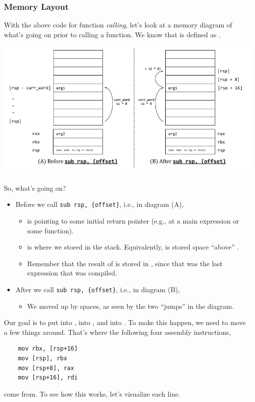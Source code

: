 \subsubsection{Memory Layout}
With the above code for function \emph{calling}, let's look at a memory diagram of what's going on prior to calling a function. We know that  is defined as .
\begin{center}
    \includegraphics[scale=0.5]{assets/function_stack_mem.png}
\end{center}

So, what's going on? 
\begin{itemize}
    \item Before we call \verb|sub rsp, {offset}|, i.e., in diagram (A), 
    \begin{itemize}
        \item \code{[rsp]} is pointing to some initial return pointer (e.g., at a main expression or some function).
        \item {} is where we stored  in the stack. Equivalently,  is stored  space ``above'' .
        \item Remember that the result of  is stored in , since that was the last expression that was compiled.
    \end{itemize}

    \item After we call \verb|sub rsp, {offset}|, i.e., in diagram (B), 
    \begin{itemize}
        \item We moved \code{[rsp]} up by  spaces, as seen by the two ``jumps'' in the diagram. 
    \end{itemize}
\end{itemize}
Our goal is to put  into \code{[rsp + 16]},  into \code{[rsp + 8]}, and  into \code{[rsp]}. To make this happen, we need to move a few things around. That's where the following four assembly instructions, 
\begin{verbatim}
    mov rbx, [rsp+16]
    mov [rsp], rbx
    mov [rsp+8], rax
    mov [rsp+16], rdi\end{verbatim}
come from. To see how this works, let's visualize each line. 

